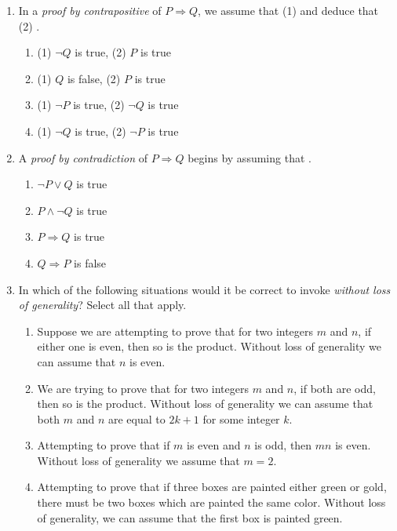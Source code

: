 \pagestyle{empty}


\begin{enumerate}
	\item In a \emph{proof by contrapositive} of $P\Longrightarrow Q$, we assume that (1) \underline{\phantom{$Q$ is false}\qquad\qquad} and deduce that (2) \underline{\phantom{$P$ is false}\qquad\qquad}.
  \begin{enumerate}
      \item (1) $\neg Q$ is true, \quad (2) $P$ is true
      \item (1) $Q$ is false, \quad (2) $P$ is true
      \item (1) $\neg P$ is true, \quad (2) $\neg Q$ is true 
      \item (1) $\neg Q$ is true, \quad (2) $\neg P$ is true
  \end{enumerate}
  
  
  \item A \emph{proof by contradiction} of $P\Longrightarrow Q$ begins by assuming that \underline{\phantom{$P$ is true and $Q$ is false}\qquad\qquad}.
  \begin{enumerate}
      \item $\neg P \vee Q$ is true
      \item $P \wedge \neg Q$ is true
      \item $P\Longrightarrow Q$ is true
      \item $Q\Longrightarrow P$ is false
  \end{enumerate}


  \item In which of the following situations would it be correct to invoke \emph{without loss of generality}? Select all that apply.
  \begin{enumerate}
		\item Suppose we are attempting to prove that for two integers $m$ and $n$, if either one is even, then so is the product. Without loss of generality we can assume that $n$ is even.
		\item We are trying to prove that for two integers $m$ and $n$, if both are odd, then so is the product. Without loss of generality we can assume that both $m$ and $n$ are equal to $2k+1$ for some integer $k$.
		\item Attempting to prove that if $m$ is even and $n$ is odd, then $mn$ is even. Without loss of generality we assume that $m=2$.
		\item Attempting to prove that if three boxes are painted either green or gold, there must be two boxes which are painted the same color. Without loss of generality, we can assume that the first box is painted green.
  \end{enumerate}
\end{enumerate}


